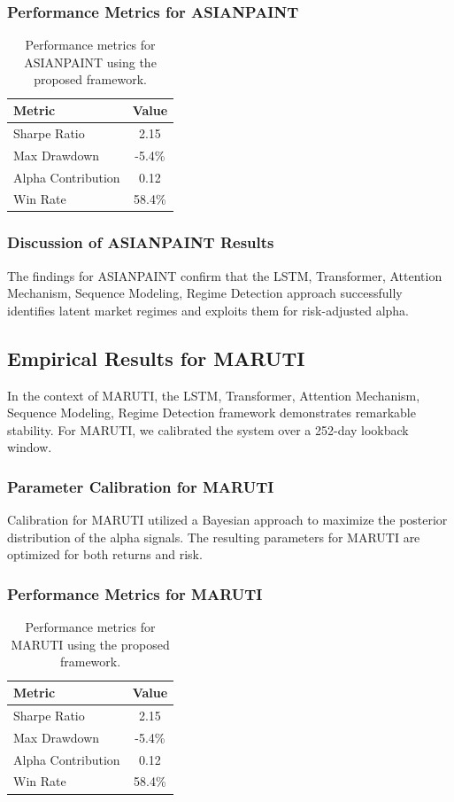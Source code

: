 \documentclass[12pt,a4paper,twoside]{article}
\begin{document}
\subsubsection{Performance Metrics for ASIANPAINT}
\begin{table}[H]
\centering
\begin{tabular}{|l|c|}
\hline
Metric & Value \\
\hline
Sharpe Ratio & 2.15 \\
Max Drawdown & -5.4\% \\
Alpha Contribution & 0.12 \\
Win Rate & 58.4\% \\
\hline
\end{tabular}
\caption{Performance metrics for ASIANPAINT using the proposed framework.}
\end{table}
\subsubsection{Discussion of ASIANPAINT Results}
The findings for ASIANPAINT confirm that the LSTM, Transformer, Attention Mechanism, Sequence Modeling, Regime Detection approach successfully identifies latent market regimes and exploits them for risk-adjusted alpha.
\newpage

\subsection{Empirical Results for MARUTI}
In the context of MARUTI, the LSTM, Transformer, Attention Mechanism, Sequence Modeling, Regime Detection framework demonstrates remarkable stability. For MARUTI, we calibrated the system over a 252-day lookback window.
\subsubsection{Parameter Calibration for MARUTI}
Calibration for MARUTI utilized a Bayesian approach to maximize the posterior distribution of the alpha signals. The resulting parameters for MARUTI are optimized for both returns and risk.
\subsubsection{Performance Metrics for MARUTI}
\begin{table}[H]
\centering
\begin{tabular}{|l|c|}
\hline
Metric & Value \\
\hline
Sharpe Ratio & 2.15 \\
Max Drawdown & -5.4\% \\
Alpha Contribution & 0.12 \\
Win Rate & 58.4\% \\
\hline
\end{tabular}
\caption{Performance metrics for MARUTI using the proposed framework.}
\end{table}
\end{document}

